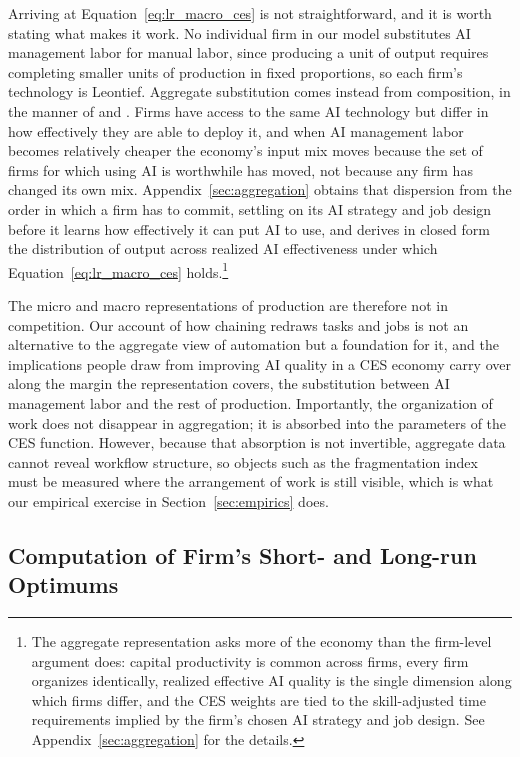 Arriving at Equation~\eqref{eq:lr_macro_ces} is not straightforward, and it is worth stating what makes it work.
No individual firm in our model substitutes AI management labor for manual labor, since producing a unit of output requires completing smaller units of production in fixed proportions, so each firm's technology is Leontief.
Aggregate substitution comes instead from composition, in the manner of \citet{houthakker1955pareto} and \citet{levhari1968note}.
Firms have access to the same AI technology but differ in how effectively they are able to deploy it, and when AI management labor becomes relatively cheaper the economy's input mix moves because the set of firms for which using AI is worthwhile has moved, not because any firm has changed its own mix.
Appendix~\ref{sec:aggregation} obtains that dispersion from the order in which a firm has to commit, settling on its AI strategy and job design before it learns how effectively it can put AI to use, and derives in closed form the distribution of output across realized AI effectiveness under which Equation~\eqref{eq:lr_macro_ces} holds.\footnote{
The aggregate representation asks more of the economy than the firm-level argument does: capital productivity is common across firms, every firm organizes identically, realized effective AI quality is the single dimension along which firms differ, and the CES weights are tied to the skill-adjusted time requirements implied by the firm's chosen AI strategy and job design. See Appendix~\ref{sec:aggregation} for the details.
}

The micro and macro representations of production are therefore not in competition.
Our account of how chaining redraws tasks and jobs is not an alternative to the aggregate view of automation but a foundation for it, and the implications people draw from improving AI quality in a CES economy carry over along the margin the representation covers, the substitution between AI management labor and the rest of production.
Importantly, the organization of work does not disappear in aggregation; it is absorbed into the parameters of the CES function.
However, because that absorption is not invertible, aggregate data cannot reveal workflow structure, so objects such as the fragmentation index must be measured where the arrangement of work is still visible, which is what our empirical exercise in Section~\ref{sec:empirics} does.


\subsection{Computation of Firm's Short- and Long-run Optimums}
\label{sec:extensions.computation}

